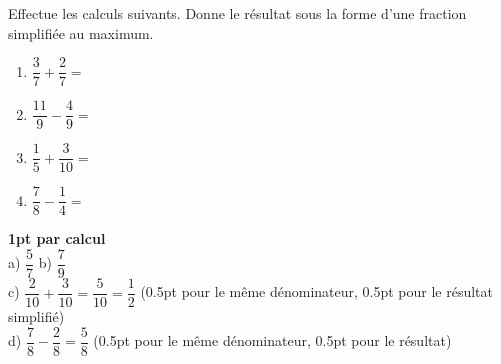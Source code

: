 
\question[4]
Effectue les calculs suivants. Donne le résultat sous la forme d'une fraction simplifiée au maximum.

\vspace{10pt}
\begin{enumerate}[leftmargin=*,align=parleft, label=\alph*), itemsep=40pt]
\item $\dfrac{3}{7} + \dfrac{2}{7} =$ 
\item $\dfrac{11}{9} - \dfrac{4}{9} =$ 
\item $\dfrac{1}{5} + \dfrac{3}{10} =$ 
\item $\dfrac{7}{8} - \dfrac{1}{4} =$ 
\end{enumerate}

\begin{solution}[0pt]
\textbf{1pt par calcul}\\[4pt]
a) $\dfrac{5}{7}$ \quad b) $\dfrac{7}{9}$\\[6pt]
c) $\dfrac{2}{10} + \dfrac{3}{10} = \dfrac{5}{10} = \dfrac{1}{2}$ (0.5pt pour le même dénominateur, 0.5pt pour le résultat simplifié)\\[6pt]
d) $\dfrac{7}{8} - \dfrac{2}{8} = \dfrac{5}{8}$ (0.5pt pour le même dénominateur, 0.5pt pour le résultat)
\end{solution}